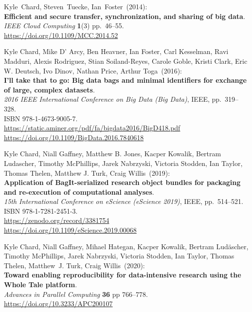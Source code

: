 \begin{thebibliography}{9}
Kyle~Chard, Steven~Tuecke, Ian~Foster~(2014):\\
\textbf{Efficient and secure transfer, synchronization, and sharing of
big data}.\\
\emph{IEEE Cloud Computing} \textbf{1}(3) pp.~46--55.\\
\url{https://doi.org/10.1109/MCC.2014.52}

Kyle Chard, Mike D' Arcy, Ben Heavner, Ian Foster, Carl
Kesselman, Ravi Madduri, Alexis Rodriguez, Stian Soiland-Reyes, Carole
Goble, Kristi Clark, Eric W. Deutsch, Ivo Dinov, Nathan Price, Arthur
Toga~(2016):\\
\textbf{I'll take that to go: Big data bags and minimal identifiers for
exchange of large, complex datasets}.\\
\emph{2016 IEEE International Conference on Big Data (Big Data)}, IEEE,
pp.~319--328.\\
ISBN 978-1-4673-9005-7.\\
\url{https://static.aminer.org/pdf/fa/bigdata2016/BigD418.pdf}\\
\url{https://doi.org/10.1109/BigData.2016.7840618}

Kyle Chard, Niall Gaffney, Matthew B. Jones, Kacper Kowalik,
Bertram Ludascher, Timothy McPhillips, Jarek Nabrzyski, Victoria
Stodden, Ian Taylor, Thomas Thelen, Matthew J. Turk, Craig Willis~(2019):\\
\textbf{Application of BagIt-serialized research object bundles for
packaging and re-execution of computational analyses}.\\
\emph{15th International Conference on eScience (eScience 2019)}, IEEE,
pp.~514--521.\\
ISBN 978-1-7281-2451-3.\\
\url{https://zenodo.org/record/3381754}\\
\url{https://doi.org/10.1109/eScience.2019.00068}

Kyle Chard, Niall Gaffney, Mihael Hategan, Kacper Kowalik,
Bertram Ludäscher, Timothy McPhillips, Jarek Nabrzyski, Victoria
Stodden, Ian Taylor, Thomas Thelen, Matthew~J. Turk, Craig Willis~(2020):\\
\textbf{Toward enabling reproducibility for data-intensive research
using the Whole Tale platform}.\\
\emph{Advances in Parallel Computing} \textbf{36} pp 766--778.\\
\url{https://doi.org/10.3233/APC200107}


\end{thebibliography}
